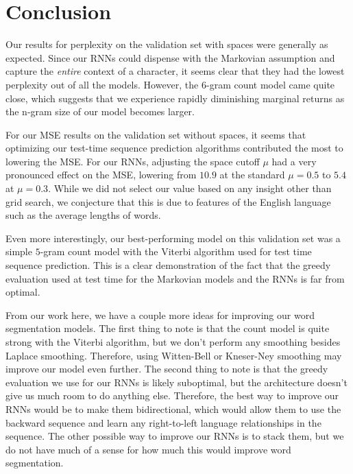 \documentclass[11pt]{article}
\begin{document}

\section{Conclusion}

Our results for perplexity on the validation set with spaces were generally as expected. Since our RNNs could dispense with the Markovian assumption and capture the \emph{entire} context of a character, it seems clear that they had the lowest perplexity out of all the models. However, the $6$-gram count model came quite close, which suggests that we experience rapidly diminishing marginal returns as the n-gram size of our model becomes larger. 

For our MSE results on the validation set without spaces, it seems that optimizing our test-time sequence prediction algorithms contributed the most to lowering the MSE. For our RNNs, adjusting the space cutoff $\mu$ had a very pronounced effect on the MSE, lowering from $10.9$ at the standard $\mu = 0.5$ to $5.4$ at $\mu = 0.3$. While we did not select our value based on any insight other than grid search, we conjecture that this is due to features of the English language such as the average lengths of words. 

Even more interestingly, our best-performing model on this validation set was a simple $5$-gram count model with the Viterbi algorithm used for test time sequence prediction. This is a clear demonstration of the fact that the greedy evaluation used at test time for the Markovian models and the RNNs is far from optimal.  

From our work here, we have a couple more ideas for improving our word segmentation models. The first thing to note is that the count model is quite strong with the Viterbi algorithm, but we don't perform any smoothing besides Laplace smoothing. Therefore, using Witten-Bell or Kneser-Ney smoothing may improve our model even further. The second thing to note is that the greedy evaluation we use for our RNNs is likely suboptimal, but the architecture doesn't give us much room to do anything else. Therefore, the best way to improve our RNNs would be to make them bidirectional, which would allow them to use the backward sequence and learn any right-to-left language relationships in the sequence. The other possible way to improve our RNNs is to stack them, but we do not have much of a sense for how much this would improve word segmentation.  



\end{document}
